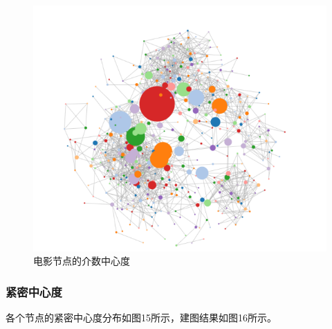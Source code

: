 \documentclass[UTF8, onecolumn, a4paper]{article}
\begin{document}
\begin{center}
\begin{figure}[ht]
\begin{minipage}[b]{0.95\linewidth}
\begin{minipage}[b]{0.46\linewidth}
				\includegraphics[width=\linewidth]{../pictures/show11}
				\caption{电影节点的介数中心度}
			\end{minipage}
		\end{minipage}
	\end{figure}
\end{center}
\subsubsection{紧密中心度}
    各个节点的紧密中心度分布如图15所示，建图结果如图16所示。
    
\end{document}
